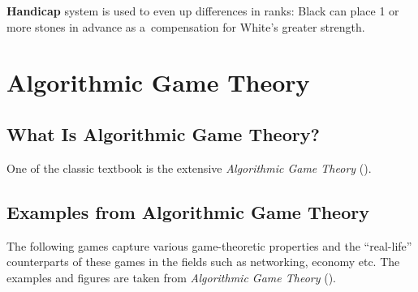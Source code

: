 \textbf{Handicap} system is used to even up differences in ranks:
Black can place 1 or more stones in advance as a~compensation for White's greater strength.

\section{Algorithmic Game Theory}

\subsection{What Is Algorithmic Game Theory?}
One of the classic textbook is the extensive \emph{Algorithmic Game Theory} (\cite{AGT07}).
\todo

\subsection{Examples from Algorithmic Game Theory}

The following games capture various game-theoretic properties and the ``real-life'' counterparts of these games in the fields such as networking, economy etc.
The examples and figures are taken from \emph{Algorithmic Game Theory} (\cite{AGT07}).

